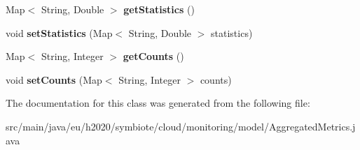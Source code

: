 \begin{DoxyCompactItemize}
\mbox{\label{classeu_1_1h2020_1_1symbiote_1_1cloud_1_1monitoring_1_1model_1_1AggregatedMetrics_a9028eed17957fe706bd3d1bf201f7fa4}} 
Map$<$ String, Double $>$ {\bfseries get\+Statistics} ()
\item 
\mbox{\label{classeu_1_1h2020_1_1symbiote_1_1cloud_1_1monitoring_1_1model_1_1AggregatedMetrics_a066a60b4857bdc64386f36922a033d0a}} 
void {\bfseries set\+Statistics} (Map$<$ String, Double $>$ statistics)
\item 
\mbox{\label{classeu_1_1h2020_1_1symbiote_1_1cloud_1_1monitoring_1_1model_1_1AggregatedMetrics_ab4bbb5ce87a3de6860324ddb9ba3367a}} 
Map$<$ String, Integer $>$ {\bfseries get\+Counts} ()
\item 
\mbox{\label{classeu_1_1h2020_1_1symbiote_1_1cloud_1_1monitoring_1_1model_1_1AggregatedMetrics_a10dac650f42a8dc8fc8f1b3b936ebf0f}} 
void {\bfseries set\+Counts} (Map$<$ String, Integer $>$ counts)
\end{DoxyCompactItemize}


The documentation for this class was generated from the following file\+:\begin{DoxyCompactItemize}
\item 
src/main/java/eu/h2020/symbiote/cloud/monitoring/model/Aggregated\+Metrics.\+java\end{DoxyCompactItemize}
